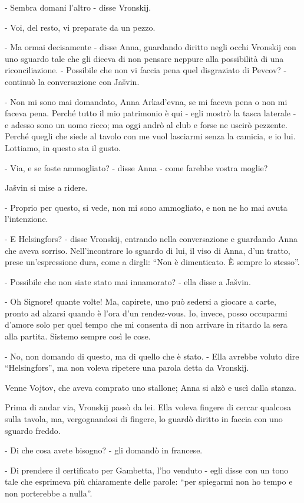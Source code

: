 - Sembra domani l'altro - disse Vronskij. 

- Voi, del resto, vi preparate da un pezzo. 

- Ma ormai decisamente - disse Anna, guardando diritto negli occhi Vronskij con uno sguardo tale che gli diceva di non pensare neppure alla possibilità di una riconciliazione. - Possibile che non vi faccia pena quel disgraziato di Pevcov? - continuò la conversazione con Jašvin. 

- Non mi sono mai domandato, Anna Arkad'evna, se mi faceva pena o non mi faceva pena. Perché tutto il mio patrimonio è qui - egli mostrò la tasca laterale - e adesso sono un uomo ricco; ma oggi andrò al club e forse ne uscirò pezzente. Perché quegli che siede al tavolo con me vuol lasciarmi senza la camicia, e io lui. Lottiamo, in questo sta il gusto. 

- Via, e se foste ammogliato? - disse Anna - come farebbe vostra moglie? 

Jašvin si mise a ridere. 

- Proprio per questo, si vede, non mi sono ammogliato, e non ne ho mai avuta l'intenzione. 

- E Helsingfors? - disse Vronskij, entrando nella conversazione e guardando Anna che aveva sorriso. Nell'incontrare lo sguardo di lui, il viso di Anna, d'un tratto, prese un'espressione dura, come a dirgli: ``Non è dimenticato. È sempre lo stesso''. 

- Possibile che non siate stato mai innamorato? - ella disse a Jašvin. 

- Oh Signore! quante volte! Ma, capirete, uno può sedersi a giocare a carte, pronto ad alzarsi quando è l'ora d'un rendez-vous. Io, invece, posso occuparmi d'amore solo per quel tempo che mi consenta di non arrivare in ritardo la sera alla partita. Sistemo sempre così le cose. 

- No, non domando di questo, ma di quello che è stato. - Ella avrebbe voluto dire ``Helsingfors'', ma non voleva ripetere una parola detta da Vronskij. 

Venne Vojtov, che aveva comprato uno stallone; Anna si alzò e uscì dalla stanza. 

Prima di andar via, Vronskij passò da lei. Ella voleva fingere di cercar qualcosa sulla tavola, ma, vergognandosi di fingere, lo guardò diritto in faccia con uno sguardo freddo. 

- Di che cosa avete bisogno? - gli domandò in francese. 

- Di prendere il certificato per Gambetta, l'ho venduto - egli disse con un tono tale che esprimeva più chiaramente delle parole: ``per spiegarmi non ho tempo e non porterebbe a nulla''. 

